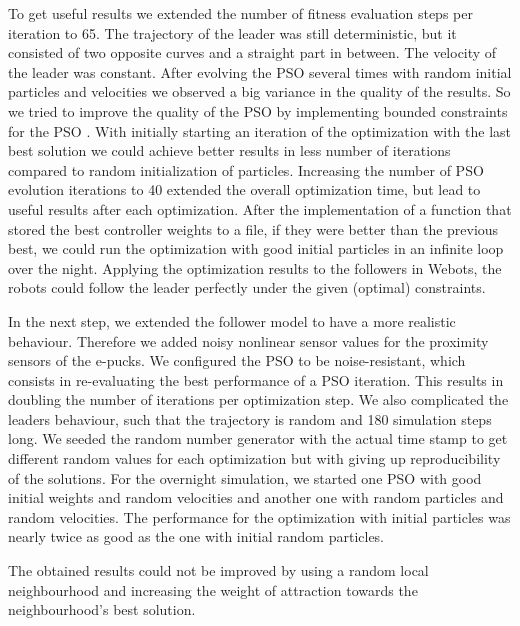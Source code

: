 \documentclass[a4paper, 10pt, conference]{ieeeconf}      %
\begin{document}
To get useful results we extended the number of fitness evaluation steps per iteration to 65. The trajectory of the leader was still deterministic, but it consisted of two opposite curves and a straight part in between. The velocity of the leader was constant. After evolving the PSO several times with random initial particles and velocities we observed a big variance in the quality of the results. So we tried to improve the quality of the PSO by implementing bounded constraints for the PSO \cite{c1}. With initially starting an iteration of the optimization with the last best solution we could achieve better results in less number of iterations compared to random initialization of particles. Increasing the number of PSO evolution iterations to 40 extended the overall optimization time, but lead to useful results after each optimization. After the implementation of a function that stored the best controller weights to a file, if they were better than the previous best, we could run the optimization with good initial particles in an infinite loop over the night. Applying the optimization results to the followers in Webots, the robots could follow the leader perfectly under the given (optimal) constraints.

In the next step, we extended the follower model to have a more realistic behaviour. Therefore we added noisy nonlinear sensor values for the proximity sensors of the e-pucks. We configured the PSO to be noise-resistant, which consists in re-evaluating the best performance of a PSO iteration. This results in doubling the number of iterations per optimization step. We also complicated the leaders behaviour, such that the trajectory is random and 180 simulation steps long. We seeded the random number generator with the actual time stamp to get different random values for each optimization but with giving up reproducibility of the solutions. For the overnight simulation, we started one PSO with good initial weights and random velocities and another one with random particles and random velocities. The performance for the optimization with initial particles was nearly twice as good as the one with initial random particles.

The obtained results could not be improved by using a random local neighbourhood and increasing the weight of attraction towards the neighbourhood's best solution.
\end{document}
